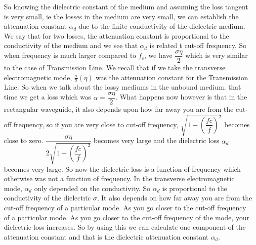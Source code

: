 So knowing the dielectric constant of the medium and assuming the loss tangent is very small, ie the losses in the medium are very small, we can establish the attenuation constant $\alpha_{d}$ due to the finite conductivity of the dielectric medium. We say that for two losses, the attenuation constant is proportional to the conductivity of the medium and we see that $\alpha_{d}$ is related t cut-off frequency.
So when frequency is much larger compared to $f_{c}$, we have $\dfrac{\sigma\eta}{2}$ which is very similar to the case of Transmission Line. We recall that if we take the transverse electromagnetic mode, $\frac{\sigma}{2}(\eta)$ was the attenuation constant for the Transmission Line.
So when we talk about the lossy mediums in the unbound medium, that time we get a loss which was $\alpha = \dfrac{\sigma\eta}{2}$. What happens now however is that in the rectangular waveguide, it also depends upon how far away you are from the cut-off frequency, so if you are very close to cut-off frequency, $\sqrt{1 - (\dfrac{fc}{f})^{2}}$ becomes close to zero.
$\dfrac{\sigma\eta}{2\sqrt{1-(\dfrac{fc}{f})^{2}}}$ becomes very large and the dielectric loss $\alpha_{d}$ becomes very large. So now the dielectric loss is a function of frequency which otherwise was not a function of frequency. In the transverse electromagnetic mode,  $\alpha_{d}$ only depended on the conductivity. So $\alpha_{d}$ is proportional to the conductivity of the dielectric $\sigma$, It also depends on how far away you are from the cut-off frequency of a particular mode. As you go closer to the cut-off frequency of a particular mode. As you go closer to the cut-off frequency of the mode, your dielectric loss increases. So by using this we can calculate one component of the attenuation constant and that is the dielectric attenuation constant $\alpha_{d}$.

